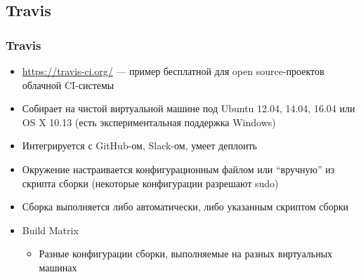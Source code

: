 \documentclass[xetex,mathserif,serif]{beamer}
\begin{document}
	\subsection{Travis}

	\begin{frame}
		\frametitle{Travis}
		\begin{itemize}
			\item \url{https://travis-ci.org/} --- пример бесплатной для open source-проектов облачной CI-системы
			\item Собирает на чистой виртуальной машине под Ubuntu 12.04, 14.04, 16.04 или OS X 10.13 (есть экспериментальная поддержка Windows)
			\item Интегрируется с GitHub-ом, Slack-ом, умеет деплоить
			\item Окружение настраивается конфигурационным файлом или ``вручную'' из скрипта сборки (некоторые конфигурации разрешают sudo)
			\item Сборка выполняется либо автоматически, либо указанным скриптом сборки
			\item Build Matrix
			\begin{itemize}
				\item Разные конфигурации сборки, выполняемые на разных виртуальных машинах
			\end{itemize}
		\end{itemize}
	\end{frame}
\end{document}
